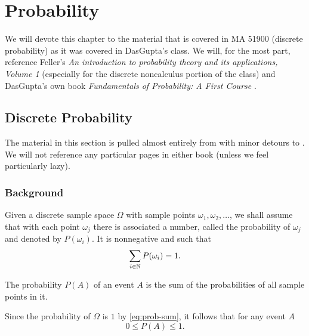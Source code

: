 \chapter{Probability}
We will devote this chapter to the material that is covered in MA 51900
(discrete probability) as it was covered in DasGupta's class. We will, for
the most part, reference Feller's \emph{An introduction to probability
  theory and its applications, Volume 1} \cite{feller} (especially for the
discrete noncalculus portion of the class) and DasGupta's own book
\emph{Fundamentals of Probability: A First Course} \cite{dasgupta}.

\section{Discrete Probability}
The material in this section is pulled almost entirely from \cite{feller}
with minor detours to \cite{dasgupta}. We will not reference any particular
pages in either book (unless we feel particularly lazy).

\subsection{Background}
Given a discrete sample space \(\Omega\) with sample points
\(\omega_1,\omega_2,\dotsc\), we shall assume that with each point
\(\omega_j\) there is associated a number, called the probability of
\(\omega_j\) and denoted by \(P(\omega_i)\). It is nonnegative and such
that
\begin{equation}
  \label{eq:prob-sum}
  \sum_{i\in\mathbb{N}} P(\omega_i)=1.
\end{equation}

\begin{definition}
  The probability \(P(A)\) of an event \(A\) is the sum of the
  probabilities of all sample points in it.
\end{definition}

Since the probability of \(\Omega\) is \(1\) by \eqref{eq:prob-sum}, it
follows that for any event \(A\)
\begin{equation}
  \label{eq:prob-event}
  0\leq P(A)\leq 1.
\end{equation}


